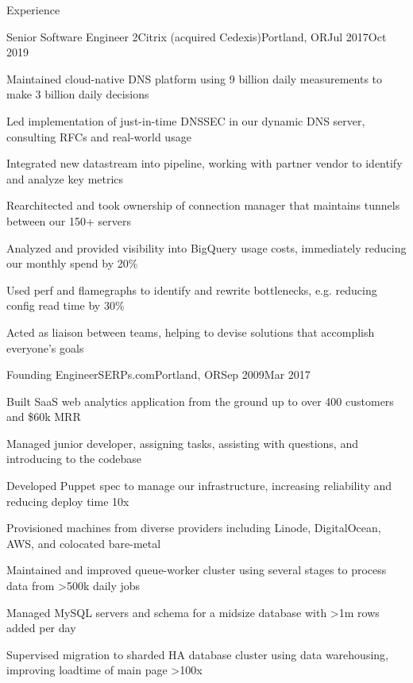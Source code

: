 \documentclass[letterpaper,12pt]{article}
\begin{document}
\begin{paracol}{2}
\begin{res_section}{Experience}
  \begin{res_experienceitem}{Senior Software Engineer 2}{Citrix (acquired Cedexis)}{Portland, OR}{Jul 2017}{Oct 2019}
  \item Maintained cloud-native DNS platform using 9 billion daily measurements to make 3 billion daily decisions
  \item Led implementation of just-in-time DNSSEC in our dynamic DNS server, consulting RFCs and real-world usage
  \item Integrated new datastream into pipeline, working with partner vendor to identify and analyze key metrics
  \item Rearchitected and took ownership of connection manager that maintains tunnels between our 150+ servers
  \item Analyzed and provided visibility into BigQuery usage costs, immediately reducing our monthly spend by 20\%
  \item Used perf and flamegraphs to identify and rewrite bottlenecks, e.g. reducing config read time by 30\%
  \item Acted as liaison between teams, helping to devise solutions that accomplish everyone's goals
\end{res_experienceitem}
\begin{res_experienceitem}{Founding Engineer}{SERPs.com}{Portland, OR}{Sep 2009}{Mar 2017}
  \item Built SaaS web analytics application from the ground up to over 400 customers and \$60k MRR
  \item Managed junior developer, assigning tasks, assisting with questions, and introducing to the codebase
  \item Developed Puppet spec to manage our infrastructure, increasing reliability and reducing deploy time 10x
  \item Provisioned machines from diverse providers including Linode, DigitalOcean, AWS, and colocated bare-metal
  \item Maintained and improved queue-worker cluster using several stages to process data from \textgreater500k daily jobs
  \item Managed MySQL servers and schema for a midsize database with \textgreater1m rows added per day
  \item Supervised migration to sharded HA database cluster using data warehousing,
        improving loadtime of main page \textgreater100x

\end{res_experienceitem}
\end{res_section}
\end{paracol}
\end{document}
